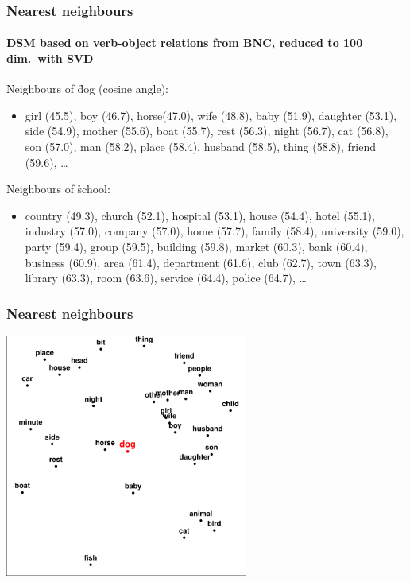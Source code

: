 \documentclass[t]{beamer} %
\begin{document}
\begin{frame}
  \frametitle{Nearest neighbours}
  \framesubtitle{DSM based on verb-object relations from BNC, reduced to 100 dim.\ with SVD}

  Neighbours of \h{dog} (cosine angle):
  \begin{itemize}\item[\hand]
    girl (45.5), boy (46.7), horse(47.0), wife (48.8), baby (51.9),
    daughter (53.1), side (54.9), mother (55.6), boat (55.7),
    rest (56.3), night (56.7), cat (56.8), son (57.0), man (58.2), 
    place (58.4), husband (58.5), thing (58.8), friend (59.6), \ldots
  \end{itemize}

  \gap
  Neighbours of \h{school}:
  \begin{itemize}\item[\hand]
    country (49.3), church (52.1), hospital (53.1), house (54.4),
    hotel (55.1), industry (57.0), company (57.0), home (57.7), family
    (58.4), university (59.0), party (59.4), group (59.5), building
    (59.8), market (60.3), bank (60.4), business (60.9), area (61.4),
    department (61.6), club (62.7), town (63.3), library (63.3), 
    room (63.6), service (64.4), police (64.7), \ldots
  \end{itemize}
\end{frame}

\begin{frame}[c]
  \frametitle{Nearest neighbours}

  \ungap[1]
  \begin{center}
    \includegraphics[width=8cm]{img/neighbourhood_dog}
  \end{center}
\end{frame}
\end{document}
